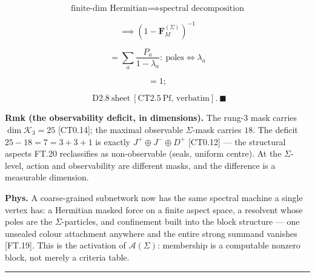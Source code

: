 \begin{theorem}
\[
\text{finite-dim Hermitian}\implies\text{spectral decomposition}
\]

\[
\implies (1-\mathbf F_M^{(\Sigma)})^{-1}
\]

\[
= \sum_a\frac{P_a}{1-\lambda_a}:\ \text{poles}\iff\lambda_a
\]

\[
= 1;
\]

\[
\ \ \mathrm{D2.8}\ \text{sheet}\ [\mathrm{CT2.5}\ \text{Pf, verbatim}].\ \blacksquare
\]

\textbf{Rmk (the observability deficit, in dimensions).} The rung-3 mask carries $\dim\mathcal K_3=25$ [CT0.14]; the maximal observable $\Sigma$-mask carries $18$. The deficit $25-18=7=3+3+1$ is exactly $J^+\oplus J^-\oplus D^+$ [CT0.12] — the structural aspects FT.20 reclassifies as non-observable (seals, uniform centre). At the $\Sigma$-level, action and observability are different masks, and the difference is a measurable dimension.

\textbf{Phys.} A coarse-grained subnetwork now has the same spectral machine a single vertex has: a Hermitian masked force on a finite aspect space, a resolvent whose poles are the $\Sigma$-particles, and confinement built into the block structure — one unsealed colour attachment anywhere and the entire strong summand vanishes [FT.19]. This is the activation of $\mathcal A(\Sigma)$: membership is a computable nonzero block, not merely a criteria table.

\vspace{2pt}\noindent\rule{\textwidth}{0.4pt}\vspace{2pt}

\end{theorem}

